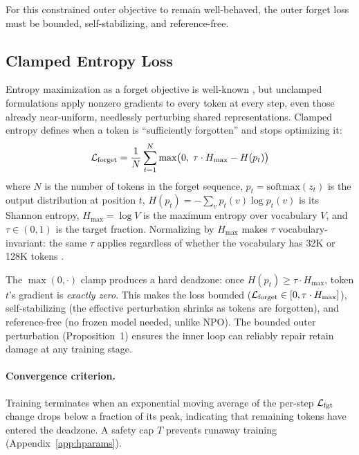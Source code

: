 For this constrained outer objective to remain well-behaved, the outer forget loss must be bounded, self-stabilizing, and reference-free.

\subsection{Clamped Entropy Loss}
\label{sec:clamped_entropy}

Entropy maximization as a forget objective is well-known \citep{yuan2025closer}, but unclamped formulations apply nonzero gradients to every token at every step, even those already near-uniform, needlessly perturbing shared representations.
Clamped entropy defines when a token is ``sufficiently forgotten'' and stops optimizing it:
\begin{equation}
    \mathcal{L}_{\text{forget}} = \frac{1}{N} \sum_{t=1}^{N} \max\!\big(0,\; \tau \cdot H_{\max} - H(p_t)\big)
    \label{eq:clamped_entropy}
\end{equation}
where $N$ is the number of tokens in the forget sequence, $p_t = \text{softmax}(z_t)$ is the output distribution at position $t$, $H(p_t) = -\sum_v p_t(v) \log p_t(v)$ is its Shannon entropy, $H_{\max} = \log V$ is the maximum entropy over vocabulary $V$, and $\tau \in (0,1)$ is the target fraction.
Normalizing by $H_{\max}$ makes $\tau$ vocabulary-invariant: the same $\tau$ applies regardless of whether the vocabulary has 32K \citep{touvron2023llama} or 128K tokens \citep{grattafiori2024llama}.

The $\max(0, \cdot)$ clamp produces a hard deadzone: once $H(p_t) \geq \tau \cdot H_{\max}$, token $t$'s gradient is \emph{exactly zero}.
This makes the loss bounded ($\mathcal{L}_{\text{forget}} \in [0, \tau \cdot H_{\max}]$), self-stabilizing (the effective perturbation shrinks as tokens are forgotten), and reference-free (no frozen model needed, unlike NPO).
The bounded outer perturbation (Proposition~1) ensures the inner loop can reliably repair retain damage at any training stage.

\paragraph{Convergence criterion.}
Training terminates when an exponential moving average of the per-step $\mathcal{L}_{\text{fgt}}$ change drops below a fraction of its peak, indicating that remaining tokens have entered the deadzone. A safety cap $T$ prevents runaway training (Appendix~\ref{app:hparams}).

